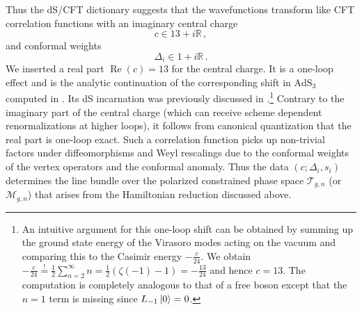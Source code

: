 \documentclass[12pt,a4paper]{article}
\renewcommand\Re{\mathop{\text{Re}}}
\newcommand\RR{\mathbb{R}}
\begin{document}
Thus the dS/CFT dictionary suggests that the wavefunctions transform like CFT correlation functions with an imaginary central charge 
\begin{equation}
    c \in 13+i \RR\, ,
\end{equation} 
and conformal weights 
\begin{equation}
    \Delta_i \in 1+i \RR\, .
\end{equation} 
We inserted a real part $\Re(c)=13$ for the central charge. It is a one-loop effect and is the analytic continuation of the corresponding shift in $\mathrm{AdS}_3$ computed in \cite{Giombi:2008vd,Cotler:2018zff}. Its dS incarnation was previously discussed in \cite{Cotler:2019nbi}.\footnote{An intuitive argument for this one-loop shift can be obtained by summing up the ground state energy of the Virasoro modes acting on the vacuum and comparing this to the Casimir energy $-\frac{c}{24}$. We obtain $-\frac{c}{24}\overset{!}{=}\frac{1}{2}\sum_{n=2}^\infty n=\frac{1}{2}(\zeta(-1)-1)=-\frac{13}{24}$ and hence $c=13$. The computation is completely analogous to that of a free boson except that the $n=1$ term is missing since $L_{-1} \ket{0}=0$.}
Contrary to the imaginary part of the central charge (which can receive scheme dependent renormalizations at higher loops), it follows from canonical quantization that the real part is one-loop exact. Such a correlation function picks up non-trivial factors under diffeomorphisms and Weyl rescalings due to the conformal weights of the vertex operators and the conformal anomaly. Thus the data $(c;\Delta_i,s_i)$ determines the line bundle over the polarized constrained phase space $\mathcal{T}_{g,n}$ (or $\mathcal{M}_{g,n}$) that arises from the Hamiltonian reduction discussed above.
\end{document}
